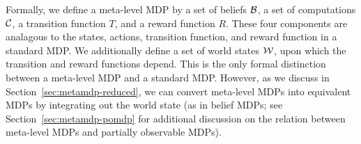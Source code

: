 Formally, we define a meta-level MDP by a set of beliefs $\mathcal{B}$, a set of computations $\mathcal{C}$, a transition function $T$, and a reward function $R$. These four components are analagous to the states, actions, transition function, and reward function in a standard MDP. We additionally define a set of world states $\mathcal{W}$, upon which the transition and reward functions depend. This is the only formal distinction between a meta-level MDP and a standard MDP. However, as we discuss in Section~\ref{sec:metamdp-reduced}, we can convert meta-level MDPs into equivalent MDPs by integrating out the world state (as in belief MDPs; see Section~\ref{sec:metamdp-pomdp} for additional discussion on the relation between meta-level MDPs and partially observable MDPs).






